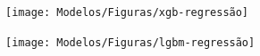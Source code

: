 \begin{figure}[H]
	\centering
	\caption{A performance da regressão utilizando XGBoost e LightGBM }
	\label{fig:1-xgb-regressao}
	
	\begin{subfigure}{1\textwidth}
			\texttt{[image: Modelos/Figuras/xgb-regressão]}
			
		\end{subfigure}\hfill
	\begin{subfigure}{1\textwidth}
			\texttt{[image: Modelos/Figuras/lgbm-regressão]}
			
		\end{subfigure}
	


\end{figure}	





